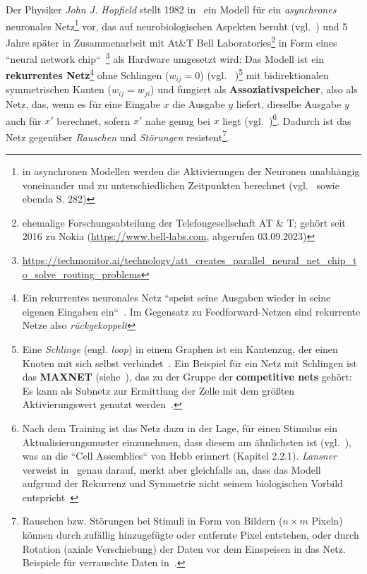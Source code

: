 Der Physiker \textit{John J. Hopfield} stellt 1982 in~\cite{Hop82} ein Modell für ein \textit{asynchrones} neuronales Netz\footnote{
    in asynchronen Modellen werden die Aktivierungen der Neuronen unabhängig voneinander und zu unterschiedlichen Zeitpunkten berechnet (vgl.~\cite[49]{Roj93} sowie ebenda S. 282)
}  vor, das auf neurobiologischen Aspekten beruht (vgl.~\cite[2554]{Hop82}) und 5 Jahre später in Zusammenarbeit mit At\&T Bell Laboratories\footnote{
    ehemalige Forschungsabteilung der Telefongesellschaft AT \& T;  gehört seit 2016 zu Nokia (\url{https://www.bell-labs.com}, abgerufen 03.09.2023)
} in Form eines ``neural network chip``~\cite[457]{AR88}\footnote{
    \url{https://techmonitor.ai/technology/att\_creates\_parallel\_neural\_net\_chip\_to\_solve\_routing\_problems}
} als Hardware umgesetzt wird: Das Modell ist ein \textbf{rekurrentes Netz}\footnote{
Ein rekurrentes neuronales Netz ``speist seine Ausgaben wieder in seine eigenen Eingaben ein``~\cite[847]{RN09}. Im Gegensatz zu Feedforward-Netzen sind rekurrente Netze also \textit{rückgekoppelt}
} ohne Schlingen ($w_{ij} = 0$) (vgl. ~\cite[291]{Ert21b})\footnote{ Eine \textit{Schlinge} (engl. \textit{loop}) in einem Graphen ist ein Kantenzug, der einen Knoten mit sich selbst verbindet~\cite[30]{Die17}. Ein Beispiel für ein Netz mit Schlingen ist das \textbf{MAXNET} (siehe~\cite{Lip87}), das zu der Gruppe der \textbf{competitive nets} gehört: Es kann als Subnetz zur Ermittlung der Zelle mit dem größten Aktivierungswert genutzt werden~\cite[158 f.]{Fau94}.
} mit bidirektionalen symmetrischen Kanten ($w_{ij} = w_{ji}$) und fungiert als \textbf{Assoziativspeicher}, also als Netz, das, wenn es für eine Eingabe $x$ die Ausgabe $y$ liefert, dieselbe Ausgabe $y$ auch für $x'$ berechnet, sofern $x'$ nahe genug bei $x$ liegt (vgl.~\cite[251]{Roj93})\footnote{
    Nach dem Training ist das Netz dazu in der Lage, für einen Stimulus ein Aktualisierungsmuster einzunehmen, dass diesem am ähnlichsten ist (vgl.~\cite[882]{RN09}), was an die ``Cell Assemblies`` von Hebb erinnert (Kapitel 2.2.1). \textit{Lansner} verweist in~\cite[179]{Lan09} genau darauf, merkt aber gleichfalls an, dass das Modell aufgrund der Rekurrenz und Symmetrie nicht seinem biologischen Vorbild entspricht~\cite[180]{Lan09}
}. Dadurch ist das Netz gegenüber \textit{Rauschen} und \textit{Störungen} resistent\footnote{
    Rauschen bzw. Störungen bei Stimuli in Form von Bildern ($n \times m$ Pixeln) können durch zufällig hinzugefügte oder entfernte Pixel entstehen, oder durch Rotation (axiale Verschiebung) der Daten vor dem Einspeisen in das Netz. Beispiele für verrauschte Daten in~\cite[294]{Ert21b}.
}.

